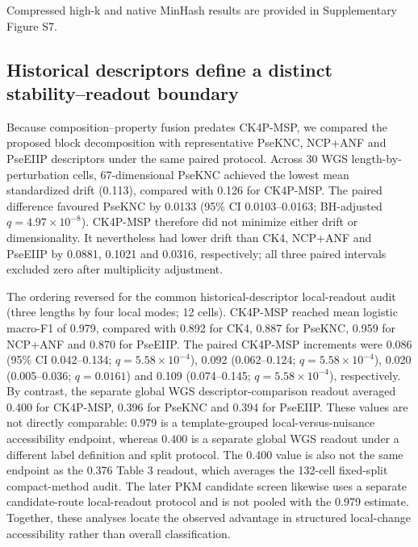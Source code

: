 Compressed high-k and native MinHash results are provided in Supplementary Figure S7.

\subsection{Historical descriptors define a distinct stability--readout boundary}

Because composition--property fusion predates CK4P-MSP, we compared the proposed block decomposition with representative PseKNC, NCP+ANF and PseEIIP descriptors under the same paired protocol. Across 30 WGS length-by-perturbation cells, 67-dimensional PseKNC achieved the lowest mean standardized drift (0.113), compared with 0.126 for CK4P-MSP. The paired difference favoured PseKNC by 0.0133 (95\% CI 0.0103--0.0163; BH-adjusted $q=4.97\times10^{-8}$). CK4P-MSP therefore did not minimize either drift or dimensionality. It nevertheless had lower drift than CK4, NCP+ANF and PseEIIP by 0.0881, 0.1021 and 0.0316, respectively; all three paired intervals excluded zero after multiplicity adjustment.

The ordering reversed for the common historical-descriptor local-readout audit (three lengths by four local modes; 12 cells). CK4P-MSP reached mean logistic macro-F1 of 0.979, compared with 0.892 for CK4, 0.887 for PseKNC, 0.959 for NCP+ANF and 0.870 for PseEIIP. The paired CK4P-MSP increments were 0.086 (95\% CI 0.042--0.134; $q=5.58\times10^{-4}$), 0.092 (0.062--0.124; $q=5.58\times10^{-4}$), 0.020 (0.005--0.036; $q=0.0161$) and 0.109 (0.074--0.145; $q=5.58\times10^{-4}$), respectively. By contrast, the separate global WGS descriptor-comparison readout averaged 0.400 for CK4P-MSP, 0.396 for PseKNC and 0.394 for PseEIIP. These values are not directly comparable: 0.979 is a template-grouped local-versus-nuisance accessibility endpoint, whereas 0.400 is a separate global WGS readout under a different label definition and split protocol. The 0.400 value is also not the same endpoint as the 0.376 Table 3 readout, which averages the 132-cell fixed-split compact-method audit. The later PKM candidate screen likewise uses a separate candidate-route local-readout protocol and is not pooled with the 0.979 estimate. Together, these analyses locate the observed advantage in structured local-change accessibility rather than overall classification.

